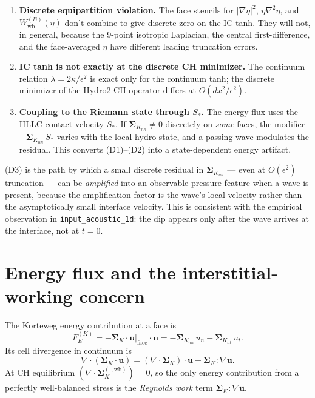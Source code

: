 \documentclass[11pt]{article}
\newcommand{\dive}{\nabla\!\cdot\!}
\newcommand{\grad}{\nabla}
\newcommand{\nn}{\mathbf{n}}
\newcommand{\uu}{\mathbf{u}}
\newcommand{\SK}{\boldsymbol{\Sigma}_K}
\newcommand{\Wb}{W_{\!\mathrm{wb}}}
\begin{document}
\begin{enumerate}
\item[(D1)] \textbf{Discrete equipartition violation.} The face stencils
for $|\grad\eta|^2$, $\eta\grad^2\eta$, and $\Wb^{(B)}(\eta)$ don't
combine to give discrete zero on the IC tanh. They will not, in general,
because the 9-point isotropic Laplacian, the central first-difference,
and the face-averaged $\eta$ have different leading truncation errors.
\item[(D2)] \textbf{IC tanh is not exactly at the discrete CH
minimizer.} The continuum relation $\lambda=2\kappa/\epsilon^2$ is
exact only for the continuum tanh; the discrete minimizer of the
Hydro2 CH operator differs at $O(dx^2/\epsilon^2)$.
\item[(D3)] \textbf{Coupling to the Riemann state through $S_*$.} The
energy flux uses the HLLC contact velocity $S_*$. If
$\SK_{nn}\ne 0$ discretely on \emph{some} faces, the modifier
$-\SK_{nn}\,S_*$ varies with the local hydro state, and a passing wave
modulates the residual. This converts (D1)--(D2) into a
state-dependent energy artifact.
\end{enumerate}

(D3) is the path by which a small discrete residual in $\SK_{nn}$ ---
even at $O(\epsilon^2)$ truncation --- can be \emph{amplified} into an
observable pressure feature when a wave is present, because the
amplification factor is the wave's local velocity rather than the
asymptotically small interface velocity. This is consistent with the
empirical observation in
\texttt{input\_acoustic\_1d}: the dip appears only after the wave arrives
at the interface, not at $t=0$.

\section{Energy flux and the interstitial-working concern}

The Korteweg energy contribution at a face is
\begin{equation}
F_E^{(K)} = -\SK\!\cdot\!\uu\big|_{\mathrm{face}}\!\cdot\!\nn = -\SK_{nn}\,u_n - \SK_{nt}\,u_t.
\end{equation}
Its cell divergence in continuum is
\begin{equation}
\dive(\SK\!\cdot\!\uu) = (\dive\SK)\!\cdot\!\uu + \SK\!:\!\grad\uu.
\label{eq:edivflux}
\end{equation}
At CH equilibrium $(\dive\SK^{(\cdot,\mathrm{wb})}) = 0$, so the only
energy contribution from a perfectly well-balanced stress is the
\emph{Reynolds work} term $\SK\!:\!\grad\uu$.
\end{document}
